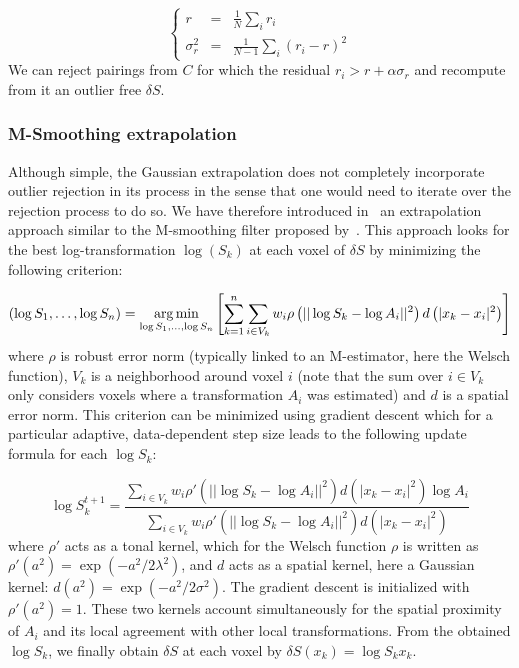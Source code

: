 \documentclass[a4paper]{article}
\def\argmin{\operatornamewithlimits{arg\,min}}
\begin{document}
\begin{equation}
\left\{
  \begin{array}{ccl}
	r &= & \frac{1}{N} \sum_i r_i \\
	\sigma_r^2 & = & \frac{1}{N-1} \sum_i (r_i - r)^2
	\end{array}
\right.
\end{equation}
We can reject pairings from $C$ for which the residual $r_i > r + \alpha \sigma_r$ and recompute from it an outlier free $\delta S$.


\subsubsection{M-Smoothing extrapolation} %
\label{ssub:m_smoothing_extrapolation}

Although simple, the Gaussian extrapolation does not completely incorporate outlier rejection in its process in the sense that one would need to iterate over the rejection process to do so. We have therefore introduced in~\cite{Commowick_Miccai_2012} an extrapolation approach similar to the M-smoothing filter proposed by~\cite{Mrazek_Chapter_2006}. This approach looks for the best log-transformation $\log(S_k)$ at each voxel of $\delta S$ by minimizing the following criterion:

\begin{equation}
	\left( \log S_1,\ldots,\log S_n \right) = \argmin_{\log S_1,\ldots,\log S_n} \left[ \sum_{k=1}^n \sum_{i \in V_k} w_i \rho\left( || \log S_k - \log A_i||^2 \right) d\left( |x_k - x_i|^2 \right) \right]
\end{equation}
where $\rho$ is robust error norm (typically linked to an M-estimator, here the Welsch function), $V_k$ is a neighborhood around voxel $i$ (note that the sum over $i \in V_k$ only considers voxels where a transformation $A_i$ was estimated) and $d$ is a spatial error norm. This criterion can be minimized using gradient descent which for a particular adaptive, data-dependent step size leads to the following update formula for each $\log S_k$:

\begin{equation}
	\log S_k^{t+1} = \frac{\sum_{i \in V_k} w_i \rho'\left( || \log S_k - \log A_i||^2 \right)d\left( |x_k - x_i|^2 \right) \log A_i}{\sum_{i \in V_k} w_i \rho'\left( || \log S_k - \log A_i||^2 \right)d\left( |x_k - x_i|^2 \right)}
\end{equation}
where $\rho'$ acts as a tonal kernel, which for the Welsch function $\rho$ is written as $\rho'(a^2) = \exp\left(-a^2 / 2\lambda^2\right)$, and $d$ acts as a spatial kernel, here a Gaussian kernel: $d(a^2) = \exp\left(- a^2 / 2\sigma^2\right)$. The gradient descent is initialized with $\rho'(a^2) = 1$. These two kernels account simultaneously for the spatial proximity of $A_i$ and its local agreement with other local transformations. From the obtained $\log S_k$, we finally obtain $\delta S$ at each voxel by $\delta S(x_k) = \log S_k x_k$.
\end{document}
